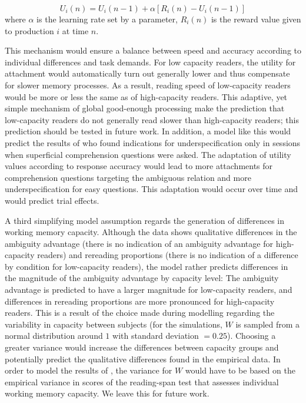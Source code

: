 \documentclass{cambridge7A}\usepackage[]{graphicx}\usepackage[]{color}
\begin{document}
\begin{equation}
\label{eq:utility}
U_i(n) = U_i(n-1) + \alpha[R_i(n)-U_i(n-1)]
\end{equation}
where $\alpha$ is the learning rate set by a parameter, $R_i(n)$ is the reward value given to production $i$ at time $n$.

This mechanism would ensure a balance between speed and accuracy according to individual differences and task demands.
For low capacity readers, the utility for attachment would automatically turn out generally lower and thus compensate for slower memory processes. As a result, reading speed of low-capacity readers would be more or less the same as of high-capacity readers. This adaptive, yet simple mechanism of global good-enough processing make the prediction that low-capacity readers do not generally read slower than high-capacity readers; this prediction should be tested in future work.
In addition, a model like this would predict the results of \cite{SwetsDesmetClifton2008} who found indications for underspecification only in sessions when superficial comprehension questions were asked. The adaptation of utility values according to response accuracy would lead to more attachments for comprehension questions targeting the ambiguous relation and more underspecification for easy questions. This adaptation would occur over time and would predict trial effects.

A third simplifying model assumption regards the generation of differences in working memory capacity. Although the data shows qualitative differences in the ambiguity advantage (there is no indication of an ambiguity advantage for high-capacity readers) and rereading proportions (there is no indication of a difference by condition for low-capacity readers), the model rather predicts differences in the magnitude of the ambiguity advantage by capacity level: The ambiguity advantage is predicted to have a larger magnitude for low-capacity readers, and differences in rereading proportions are more pronounced for high-capacity readers. This is a result of the choice made during modelling regarding the variability in capacity between subjects (for the simulations, $W$ is sampled from a normal distribution around $1$ with standard deviation $=0.25$). Choosing a greater variance would increase the differences between capacity groups and potentially predict the qualitative differences found in the empirical data. In order to model the results of \cite{MalsburgVasishth2013}, the variance for $W$ would have to be based on the empirical variance in scores of the reading-span test that assesses individual working memory capacity. We leave this for future work.
\end{document}
